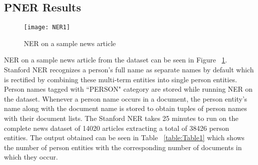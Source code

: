 \subsection{PNER Results}

\begin{figure}[h]
  \centering
\texttt{[image: NER1]}
\caption{NER on a sample news article}
\label{figure:sample}
\end{figure} 




NER on a sample news article from the dataset can be seen in Figure ~\ref{figure:sample}.
 Stanford NER recognizes a person's full name as separate names by default which is rectified by combining these multi-term entities into single person entities. Person names tagged with ``PERSON" category are stored while running NER on the dataset.
Whenever a person name occurs in a document, the person entity's name along with the document name is stored to obtain tuples of person names with their document lists.
The Stanford NER takes 25 minutes to run on the complete news dataset of 14020 articles extracting a total of 38426 person entities. The output obtained can be seen in Table ~\ref{table:Table1} which shows the number of person entities with the corresponding number of documents in which they occur.  


